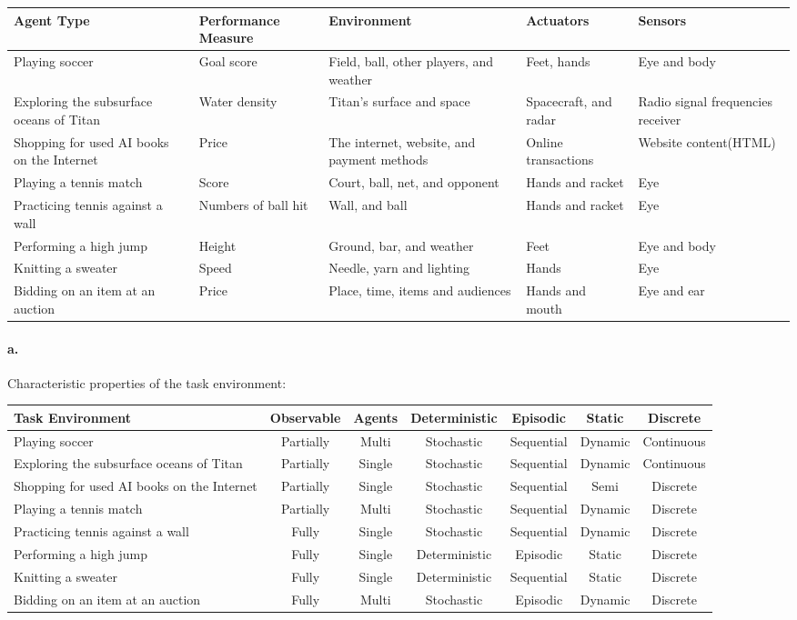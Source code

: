 \documentclass[a4paper]{article}
\begin{document}
\renewcommand{\arraystretch}{1.5}
\begin{tabularx}{1\textwidth}{ | L || L | L | L | L | }
\hline
Agent Type & Performance Measure & Environment & Actuators & Sensors \tabularnewline \hline
Playing soccer & Goal score & Field, ball, other players, and weather & Feet, hands & Eye and body \tabularnewline \hline
Exploring the subsurface oceans of Titan & Water density & Titan's surface and space & Spacecraft, and radar & Radio signal frequencies receiver \tabularnewline \hline
Shopping for used AI books on the Internet & Price & The internet, website, and payment methods & Online transactions & Website content(HTML) \tabularnewline \hline
Playing a tennis match & Score & Court, ball, net, and opponent & Hands and racket & Eye \tabularnewline \hline
Practicing tennis against a wall & Numbers of ball hit & Wall, and ball & Hands and racket & Eye \tabularnewline \hline
Performing a high jump & Height & Ground, bar, and weather & Feet & Eye and body \tabularnewline \hline
Knitting a sweater & Speed & Needle, yarn and lighting & Hands & Eye \tabularnewline \hline
Bidding on an item at an auction & Price & Place, time, items and audiences & Hands and mouth & Eye and ear \tabularnewline
\hline
\end{tabularx}

\paragraph{a.} Characteristic properties of the task environment:

\begin{tabularx}{1\textwidth}{ | L || c c c c c c | }
\hline
Task Environment & Observable & Agents & Deterministic & Episodic & Static & Discrete \tabularnewline \hline
\hline
Playing soccer & Partially & Multi & Stochastic & Sequential & Dynamic & Continuous \tabularnewline \hline
Exploring the subsurface oceans of Titan & Partially & Single & Stochastic & Sequential & Dynamic & Continuous  \tabularnewline \hline
Shopping for used AI books on the Internet & Partially & Single & Stochastic & Sequential & Semi & Discrete \tabularnewline \hline
Playing a tennis match & Partially & Multi & Stochastic & Sequential & Dynamic & Discrete \tabularnewline \hline
Practicing tennis against a wall & Fully & Single & Stochastic & Sequential & Dynamic & Discrete \tabularnewline \hline
Performing a high jump & Fully & Single & Deterministic & Episodic & Static & Discrete \tabularnewline \hline
Knitting a sweater & Fully & Single & Deterministic & Sequential & Static & Discrete \tabularnewline \hline
Bidding on an item at an auction & Fully & Multi & Stochastic & Episodic & Dynamic & Discrete \tabularnewline
\hline
\end{tabularx}
\end{document}
